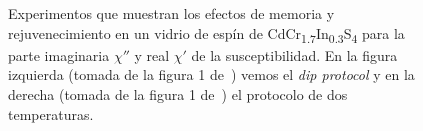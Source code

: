 \documentclass[11pt]{report}
\begin{document}
\begin{figure}
  \centering


    \caption{Experimentos que muestran los efectos de memoria y
      rejuvenecimiento en un vidrio de espín de
      CdCr\textsubscript{1.7}In\textsubscript{0.3}S\textsubscript{4}
      para la parte imaginaria $χ''$ y real $χ'$ de la
      susceptibilidad. En la figura izquierda (tomada de la figura 1
      de~\cite{dippaper}) vemos el \textit{dip protocol} y en la
      derecha (tomada de la figura 1 de~\cite{threeprotocolpaper})
      el protocolo de dos temperaturas.}
  \label{fig:experimental}
\end{figure}
\end{document}
